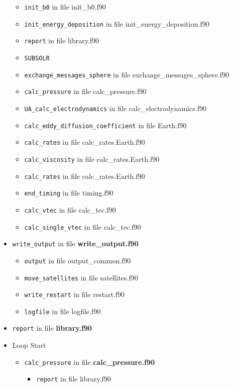 \begin{itemize}
\begin{itemize}
    \item {\tt init\_b0} in file init\_b0.f90
    \item {\tt init\_energy\_deposition} in file init\_energy\_deposition.f90
    \item {\tt report} in file library.f90
    \item {\tt SUBSOLR}
    \item {\tt exchange\_messages\_sphere} in file exchange\_messages\_sphere.f90
    \item {\tt calc\_pressure} in file calc\_pressure.f90
    \item {\tt UA\_calc\_electrodynamics} in file calc\_electrodynamics.f90
    \item {\tt calc\_eddy\_diffusion\_coefficient} in file Earth.f90
    \item {\tt calc\_rates} in file calc\_rates.Earth.f90
    \item {\tt calc\_viscosity} in file calc\_rates.Earth.f90
    \item {\tt calc\_rates} in file calc\_rates.Earth.f90
    \item {\tt end\_timing} in file timing.f90
    \item {\tt calc\_vtec} in file calc\_tec.f90
    \item {\tt calc\_single\_vtec} in file calc\_tec.f90
  \end{itemize}


\item {\tt write\_output}   in file {\bf write\_output.f90}
  \begin{itemize}
    \item {\tt output} in file output\_common.f90
    \item {\tt move\_satellites} in file satellites.f90
    \item {\tt write\_restart} in file restart.f90
    \item {\tt logfile} in file logfile.f90
  \end{itemize}


\item {\tt report}   in file {\bf library.f90}


\item Loop Start
  \begin{itemize}


  \item {\tt calc\_pressure}   in file {\bf calc\_pressure.f90}
    \begin{itemize}
      \item {\tt report} in file library.f90
    \end{itemize}



\end{itemize}
\end{itemize}
